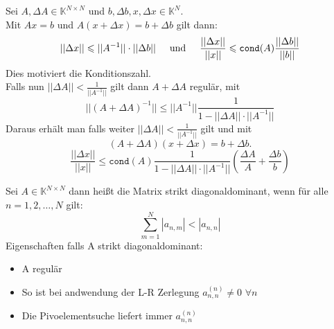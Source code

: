\documentclass{report}
\begin{document}
 {
  Sei $A, \Delta A \in \mathbb{K}^{N \times N}$ und 
  $b, \Delta b, x, \Delta x \in \mathbb{K}^N$.\\
  Mit $Ax = b$ und $A(x + \Delta x) = b + \Delta b$ gilt dann:
  \[
    ||\Delta x || \leq ||A^{-1}||\cdot ||\Delta b|| 
    \hspace{0.5cm} \text{und} \hspace{0.5cm}
    \frac{||\Delta x ||}{||x||} 
      \leq \texttt{cond}(A) \frac{||\Delta b||}{||b||}
  \]
  Dies motiviert die Konditionszahl. \\
  Falls nun $||\Delta A|| < \frac{1}{||A^{-1}||}$ gilt 
  dann $A + \Delta A$ regulär, mit
  \[
    ||(A+\Delta A)^{-1}|| 
      \leq ||A^{-1}|| \frac{1}{1- ||\Delta A||\cdot ||A^{-1}||}
  \]
  Daraus erhält man falls weiter 
    $||\Delta A|| < \frac{1}{||A^{-1}||}$ gilt und mit
  \[
    (A+\Delta A)(x + \Delta x) = b + \Delta b.
  \]
  \[
    \frac{||\Delta x||}{||x||} \leq \texttt{cond}(A) 
      \frac{1}{1- ||\Delta A||\cdot ||A^{-1}||}
      (\frac{\Delta A}{A} + \frac{\Delta b}{b})
  \]
}

 {
  Sei $A \in \mathbb{K}^{N\times N}$ dann heißt die 
  Matrix strikt diagonaldominant, wenn für alle $n = 1, 2, \hdots, N$ gilt: 
  \[
    \sum_{m=1}^N |a_{n,m}| < |a_{n,n}|
  \]
  Eigenschaften falls A strikt diagonaldominant: 
  \begin{itemize}
    \item A regulär
    \item So ist bei andwendung der L-R Zerlegung 
      $a_{n,n}^{(n)} \neq 0$ $\forall n$
    \item Die Pivoelementsuche liefert immer $a_{n,n}^{(n)}$
  \end{itemize}
}
\end{document}
